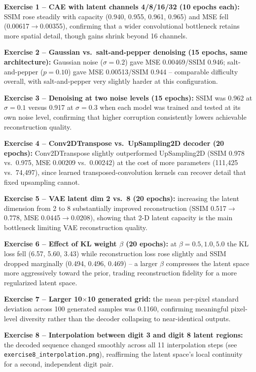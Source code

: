 \documentclass[10pt]{article}
\begin{document}
\textbf{Exercise 1 -- CAE with latent channels 4/8/16/32 (10 epochs each):} SSIM rose steadily with
capacity (0.940, 0.955, 0.961, 0.965) and MSE fell (0.00617$\to$0.00355), confirming that a wider
convolutional bottleneck retains more spatial detail, though gains shrink beyond 16 channels.

\textbf{Exercise 2 -- Gaussian vs.\ salt-and-pepper denoising (15 epochs, same architecture):} Gaussian
noise ($\sigma=0.2$) gave MSE 0.00469/SSIM 0.946; salt-and-pepper ($p=0.10$) gave MSE 0.00513/SSIM 0.944
-- comparable difficulty overall, with salt-and-pepper very slightly harder at this configuration.

\textbf{Exercise 3 -- Denoising at two noise levels (15 epochs):} SSIM was 0.962 at $\sigma=0.1$ versus
0.917 at $\sigma=0.3$ when each model was trained and tested at its own noise level, confirming that
higher corruption consistently lowers achievable reconstruction quality.

\textbf{Exercise 4 -- Conv2DTranspose vs.\ UpSampling2D decoder (20 epochs):} Conv2DTranspose slightly
outperformed UpSampling2D (SSIM 0.978 vs.\ 0.975, MSE 0.00209 vs.\ 0.00242) at the cost of more
parameters (111{,}425 vs.\ 74{,}497), since learned transposed-convolution kernels can recover detail
that fixed upsampling cannot.

\textbf{Exercise 5 -- VAE latent dim 2 vs.\ 8 (20 epochs):} increasing the latent dimension from 2 to 8
substantially improved reconstruction (SSIM 0.517$\to$0.778, MSE 0.0445$\to$0.0208), showing that 2-D
latent capacity is the main bottleneck limiting VAE reconstruction quality.

\textbf{Exercise 6 -- Effect of KL weight $\beta$ (20 epochs):} at $\beta=0.5,1.0,5.0$ the KL loss fell
(6.57, 5.60, 3.43) while reconstruction loss rose slightly and SSIM dropped marginally (0.494, 0.496,
0.469) -- a larger $\beta$ compresses the latent space more aggressively toward the prior, trading
reconstruction fidelity for a more regularized latent space.

\textbf{Exercise 7 -- Larger 10$\times$10 generated grid:} the mean per-pixel standard deviation across
100 generated samples was 0.1160, confirming meaningful pixel-level diversity rather than the decoder
collapsing to near-identical outputs.

\textbf{Exercise 8 -- Interpolation between digit 3 and digit 8 latent regions:} the decoded sequence
changed smoothly across all 11 interpolation steps (see \texttt{exercise8\_interpolation.png}), reaffirming
the latent space's local continuity for a second, independent digit pair.
\end{document}
